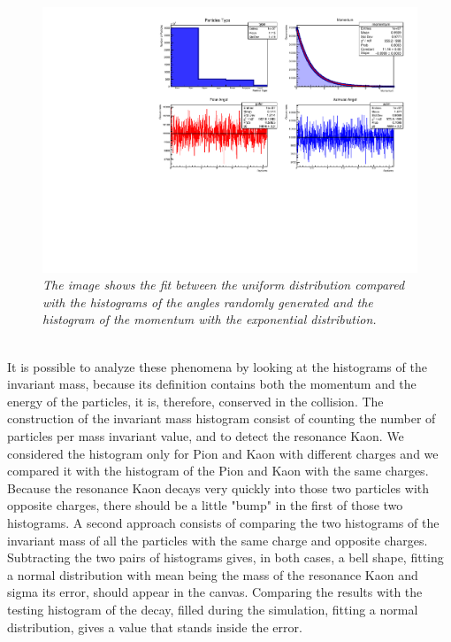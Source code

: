 \documentclass[a4paper, 11pt]{article}
\begin{document}
    \begin{figure}[h!]
      \centering
      \includegraphics[width=.8\linewidth]{can.pdf}
      \caption{\label{f2} \textit{The image shows the fit between the uniform distribution compared with the histograms of the angles randomly generated and the histogram of the momentum with the exponential distribution.}}
    \end{figure}
    \\
    It is possible to analyze these phenomena by looking at the histograms of the invariant mass, because its definition contains both the momentum and the energy of the particles, it is, therefore, conserved in the collision. The construction of the invariant mass histogram consist of counting the number of particles per mass invariant value, and to detect the resonance Kaon. We considered the histogram only for Pion and Kaon with different charges and we compared it with the histogram of the Pion and Kaon with the same charges. Because the resonance Kaon decays very quickly into those two particles with opposite charges, there should be a little "bump" in the first of those two histograms.
    A second approach consists of comparing the two histograms of the invariant mass of all the particles with the same charge and opposite charges.
    \\
    Subtracting the two pairs of histograms gives, in both cases, a bell shape, fitting a normal distribution with mean being the mass of the resonance Kaon and sigma its error, should appear in the canvas. Comparing the results with the testing histogram of the decay, filled during the simulation, fitting a normal distribution, gives a value that stands inside the error.\\
\end{document}
